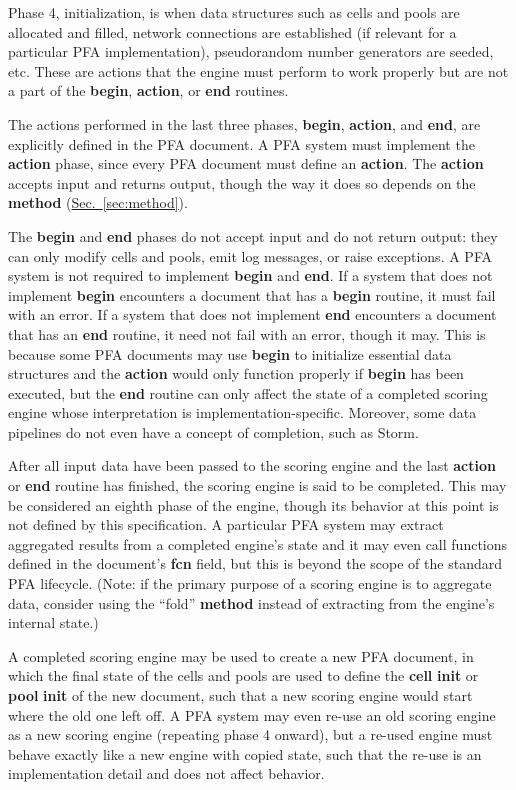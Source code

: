 \documentclass{article}
\newcommand{\PFAc}{\ttfamily\bfseries}
\theoremstyle{definition}
\begin{document}
Phase 4, initialization, is when data structures such as cells and pools are allocated and filled, network connections are established (if relevant for a particular PFA implementation), pseudorandom number generators are seeded, etc.  These are actions that the engine must perform to work properly but are not a part of the {\PFAc begin}, {\PFAc action}, or {\PFAc end} routines.

The actions performed in the last three phases, {\PFAc begin}, {\PFAc action}, and {\PFAc end}, are explicitly defined in the PFA document.  A PFA system must implement the {\PFAc action} phase, since every PFA document must define an {\PFAc action}.  The {\PFAc action} accepts input and returns output, though the way it does so depends on the {\PFAc method} (\hyperlink{hsec:method}{Sec.~\ref{sec:method}}).

The {\PFAc begin} and {\PFAc end} phases do not accept input and do not return output: they can only modify cells and pools, emit log messages, or raise exceptions.  A PFA system is not required to implement {\PFAc begin} and {\PFAc end}.  If a system that does not implement {\PFAc begin} encounters a document that has a {\PFAc begin} routine, it must fail with an error.  If a system that does not implement {\PFAc end} encounters a document that has an {\PFAc end} routine, it need not fail with an error, though it may.  This is because some PFA documents may use {\PFAc begin} to initialize essential data structures and the {\PFAc action} would only function properly if {\PFAc begin} has been executed, but the {\PFAc end} routine can only affect the state of a completed scoring engine whose interpretation is implementation-specific.  Moreover, some data pipelines do not even have a concept of completion, such as Storm.

After all input data have been passed to the scoring engine and the last {\PFAc action} or {\PFAc end} routine has finished, the scoring engine is said to be completed.  This may be considered an eighth phase of the engine, though its behavior at this point is not defined by this specification.  A particular PFA system may extract aggregated results from a completed engine's state and it may even call functions defined in the document's {\PFAc fcn} field, but this is beyond the scope of the standard PFA lifecycle.  (Note: if the primary purpose of a scoring engine is to aggregate data, consider using the ``fold'' {\PFAc method} instead of extracting from the engine's internal state.)

A completed scoring engine may be used to create a new PFA document, in which the final state of the cells and pools are used to define the {\PFAc cell} {\PFAc init} or {\PFAc pool} {\PFAc init} of the new document, such that a new scoring engine would start where the old one left off.  A PFA system may even re-use an old scoring engine as a new scoring engine (repeating phase 4 onward), but a re-used engine must behave exactly like a new engine with copied state, such that the re-use is an implementation detail and does not affect behavior.
\end{document}
